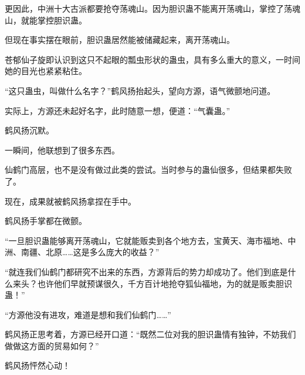 \begin{this_body}
更因此，中洲十大古派都要抢夺荡魂山。因为胆识蛊不能离开荡魂山，掌控了荡魂山，就能掌控胆识蛊。

但现在事实摆在眼前，胆识蛊居然能被储藏起来，离开荡魂山。

苍郁仙子旋即认识到这只不起眼的瓢虫形状的蛊虫，具有多么重大的意义，一时间她的目光也紧紧粘住。

“这只蛊虫，叫做什么名字？”鹤风扬抬起头，望向方源，语气微颤地问道。

实际上，方源还未起好名字，此时随意一想，便道：“气囊蛊。”

鹤风扬沉默。

一瞬间，他联想到了很多东西。

仙鹤门高层，也不是没有做过此类的尝试。当时参与的蛊仙很多，但结果都失败了。

现在，成果就被鹤风扬拿捏在手中。

鹤风扬手掌都在微颤。

“一旦胆识蛊能够离开荡魂山，它就能贩卖到各个地方去，宝黄天、海市福地、中洲、南疆、北原……这是多么庞大的收益？”

“就连我们仙鹤门都研究不出来的东西，方源背后的势力却成功了。他们到底是什么来头？也许他们早就预谋很久，千方百计地抢夺狐仙福地，为的就是贩卖胆识蛊！”

“方源他没有进攻，难道是想和我们仙鹤门……”

鹤风扬正思考着，方源已经开口道：“既然二位对我的胆识蛊情有独钟，不妨我们做做这方面的贸易如何？”

鹤风扬怦然心动！

\end{this_body}

